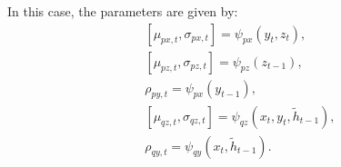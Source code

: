 \documentclass{article}
\def\p{p_{\theta}}
\begin{document}
In this case, the parameters are given by:
\begin{align*}
    &[\mu_{px,t}, \sigma_{px,t}]  = \psi_{px}(y_t, z_t),\\
    &[\mu_{pz,t}, \sigma_{pz,t}]  = \psi_{pz }(z_{t-1}), \\
    &\rho_{py,t}  = \psi_{px}(y_{t-1}),\\
     &[\mu_{qz,t}, \sigma_{qz,t}] = \psi_{qz}( x_t, y_t,\tilde{h}_{t-1})\text{, }\\
    &\rho_{qy,t}  = \psi_{qy}( x_t, \tilde{h}_{t-1}) \text{.}
\end{align*} 




\end{document}
